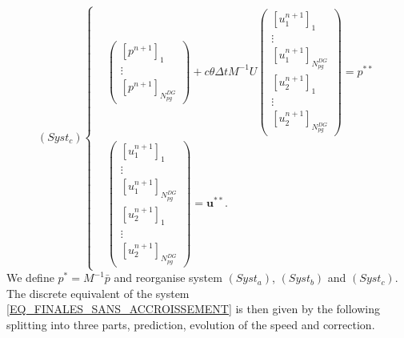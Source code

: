 \documentclass[a4paper, 11pt]{report}
\begin{document}
\begin{equation*}
(Syst_c)\left\{\begin{split}
&\begin{pmatrix}\left[p^{n+1}\right]_1\\ \vdots \\ \left[p^{n+1}\right]_{N_{pg}^{DG}}\end{pmatrix}+c\theta\Delta tM^{-1}U\begin{pmatrix}\left[u_1^{n+1}\right]_1\\ \vdots \\ \left[u_1^{n+1}\right]_{N_{pg}^{DG}}\\ \left[u_2^{n+1}\right]_1\\ \vdots \\ \left[u_2^{n+1}\right]_{N_{pg}^{DG}}\end{pmatrix}=p^{**}\\
&\begin{pmatrix}\left[u_1^{n+1}\right]_1\\ \vdots \\ \left[u_1^{n+1}\right]_{N_{pg}^{DG}}\\ \left[u_2^{n+1}\right]_1\\ \vdots \\ \left[u_2^{n+1}\right]_{N_{pg}^{DG}}\end{pmatrix}=\boldsymbol{u}^{**}.
\end{split}\right.
\end{equation*}
We define $p^{*}=M^{-1}\bar{p}$ and reorganise system $(Syst_a)$, $(Syst_b)$ and $(Syst_c)$.
The discrete equivalent of the system \eqref{EQ_FINALES_SANS_ACCROISSEMENT} is then given by the following splitting into three parts, prediction, evolution of the speed and correction.
\end{document}
